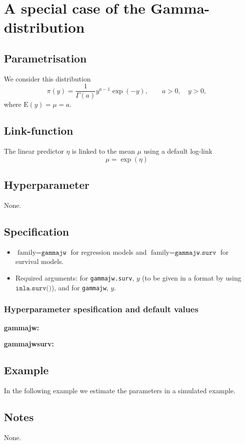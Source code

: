 \documentclass[a4paper,11pt]{article}
\begin{document}
\section*{A special case of the Gamma-distribution}

\subsection*{Parametrisation}

We consider this distribution
\begin{displaymath}
    \pi(y) = \frac{1}{\Gamma(a)} y^{a-1} \exp(-y), \qquad a>0,
    \quad y >0,
\end{displaymath}
where $\text{E}(y) = \mu = a$.

\subsection*{Link-function}

The linear predictor $\eta$ is linked to the mean $\mu$ using a
default log-link
\begin{displaymath}
    \mu = \exp(\eta)
\end{displaymath}

\subsection*{Hyperparameter}

None.

\subsection*{Specification}

\begin{itemize}
\item $\text{family}=\texttt{gammajw}$ for regression models and
    $\text{family}=\texttt{gammajw.surv}$ for survival models.
\item Required arguments: for \texttt{gammajw.surv}, $y$ (to be given in
    a format by using $\texttt{inla.surv()}$), and for \texttt{gammajw},
    $y$.
\end{itemize}

\subsubsection*{Hyperparameter spesification and default values}

\textbf{gammajw:}


\textbf{gammajwsurv:}


\subsection*{Example}

In the following example we estimate the parameters in a simulated
example.


\subsection*{Notes}

None.
\end{document}
